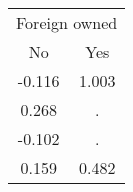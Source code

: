 \begin{tabular}{cc}
\toprule
\multicolumn{2}{c}{Foreign owned} \\
\cmidrule(lr){1-2}
No & Yes \\
\midrule
-0.116 & 1.003 \\
0.268 & . \\
-0.102 & . \\
0.159 & 0.482 \\
\bottomrule
\end{tabular}
